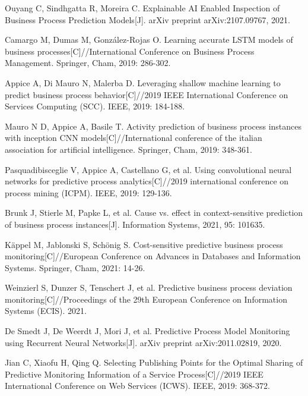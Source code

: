 \documentclass[runningheads]{llncs}
\begin{document}
\begin{thebibliography}{99}
	
	Ouyang C, Sindhgatta R, Moreira C. Explainable AI Enabled Inspection of Business Process Prediction Models[J]. arXiv preprint arXiv:2107.09767, 2021.
	
	Camargo M, Dumas M, González-Rojas O. Learning accurate LSTM models of business processes[C]//International Conference on Business Process Management. Springer, Cham, 2019: 286-302.
	
	Appice A, Di Mauro N, Malerba D. Leveraging shallow machine learning to predict business process behavior[C]//2019 IEEE International Conference on Services Computing (SCC). IEEE, 2019: 184-188.
	
	Mauro N D, Appice A, Basile T. Activity prediction of business process instances with inception CNN models[C]//International conference of the italian association for artificial intelligence. Springer, Cham, 2019: 348-361.
	
	Pasquadibisceglie V, Appice A, Castellano G, et al. Using convolutional neural networks for predictive process analytics[C]//2019 international conference on process mining (ICPM). IEEE, 2019: 129-136.
	
	Brunk J, Stierle M, Papke L, et al. Cause vs. effect in context-sensitive prediction of business process instances[J]. Information Systems, 2021, 95: 101635.
	
	Käppel M, Jablonski S, Schönig S. Cost-sensitive predictive business process monitoring[C]//European Conference on Advances in Databases and Information Systems. Springer, Cham, 2021: 14-26.
	
	Weinzierl S, Dunzer S, Tenschert J, et al. Predictive business process deviation monitoring[C]//Proceedings of the 29th European Conference on Information Systems (ECIS). 2021.
	
	De Smedt J, De Weerdt J, Mori J, et al. Predictive Process Model Monitoring using Recurrent Neural Networks[J]. arXiv preprint arXiv:2011.02819, 2020.
	
	Jian C, Xiaofu H, Qing Q. Selecting Publishing Points for the Optimal Sharing of Predictive Monitoring Information of a Service Process[C]//2019 IEEE International Conference on Web Services (ICWS). IEEE, 2019: 368-372.
	

\end{thebibliography}
\end{document}
